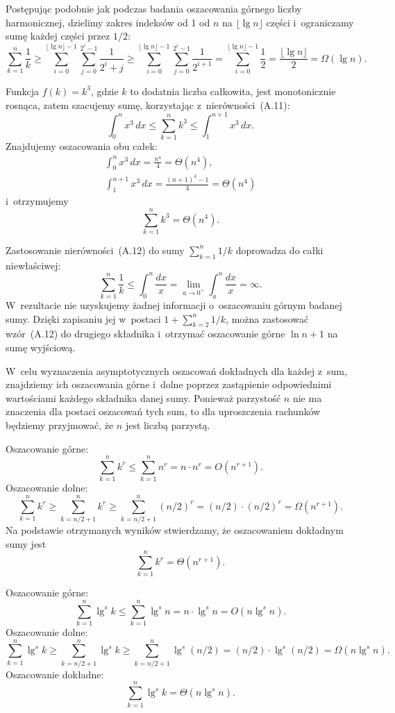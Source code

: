 \exercise %
Postępując podobnie jak podczas badania oszacowania górnego  liczby harmonicznej, dzielimy zakres indeksów od 1 od $n$ na $\lfloor\lg n\rfloor$ części i~ograniczamy sumę każdej części przez $1/2$:
\[
    \sum_{k=1}^n\frac{1}{k} \ge \sum_{i=0}^{\lfloor\lg n\rfloor-1}\sum_{j=0}^{2^i-1}\frac{1}{2^i+j} \ge \sum_{i=0}^{\lfloor\lg n\rfloor-1}\sum_{j=0}^{2^i-1}\frac{1}{2^{i+1}} = \sum_{i=0}^{\lfloor\lg n\rfloor-1}\frac{1}{2} = \frac{\lfloor\lg n\rfloor}{2} = \Omega(\lg n).
\]

\exercise %
Funkcja $f(k)=k^3$, gdzie $k$ to dodatnia liczba całkowita, jest monotonicznie rosnąca, zatem szacujemy sumę, korzystając z~nierówności~(A.11):
\[
	\int_0^nx^3\,dx \le \sum_{k=1}^nk^3 \le \int_1^{n+1}x^3\,dx.
\]
Znajdujemy oszacowania obu całek:
\begin{gather*}
	\int_0^nx^3\,dx = \frac{n^4}{4} = \Theta(n^4), \\[2mm]
	\int_1^{n+1}x^3\,dx = \frac{(n+1)^4-1}{4} = \Theta(n^4)
\end{gather*}
i~otrzymujemy
\[
	\sum_{k=1}^nk^3 = \Theta(n^4).
\]

\exercise %
Zastosowanie nierówności~(A.12) do sumy $\sum_{k=1}^n1/k$ doprowadza do całki niewłaściwej:
\[
	\sum_{k=1}^n\frac{1}{k} \le \int_0^n\frac{dx}{x} = \lim_{a\to0^+}\int_a^n\frac{dx}{x} = \infty.
\]
W~rezultacie nie uzyskujemy żadnej informacji o~oszacowaniu górnym badanej sumy. Dzięki zapisaniu jej w~postaci $1+\sum_{k=2}^n1/k$, można zastosować wzór~(A.12) do drugiego składnika i~otrzymać oszacowanie górne $\ln n+1$ na sumę wyjściową.

\problems

W~celu wyznaczenia asymptotycznych oszacowań dokładnych dla każdej z~sum, znajdziemy ich oszacowania górne i~dolne poprzez zastąpienie odpowiednimi wartościami każdego składnika danej sumy. Ponieważ parzystość $n$ nie ma znaczenia dla postaci oszacowań tych sum, to dla uproszczenia rachunków będziemy przyjmować, że $n$ jest liczbą parzystą.

\subproblem %
Oszacowanie górne:
\[
    \sum_{k=1}^nk^r \le \sum_{k=1}^nn^r = n\cdot n^r = O(n^{r+1}).
\]
Oszacowanie dolne:
\[
    \sum_{k=1}^nk^r \ge \sum_{k=n/2+1}^nk^r \ge \sum_{k=n/2+1}^n(n/2)^r = (n/2)\cdot(n/2)^r = \Omega(n^{r+1}).
\]
Na podstawie otrzymanych wyników stwierdzamy, że oszacowaniem dokładnym sumy jest
\[
    \sum_{k=1}^nk^r = \Theta(n^{r+1}).
\]

\subproblem %
Oszacowanie górne:
\[
    \sum_{k=1}^n\lg^sk \le \sum_{k=1}^n\lg^sn = n\cdot\lg^sn = O(n\lg^sn).
\]
Oszacowanie dolne:
\[
    \sum_{k=1}^n\lg^sk \ge \sum_{k=n/2+1}^n\lg^sk \ge \sum_{k=n/2+1}^n\lg^s(n/2) = (n/2)\cdot\lg^s(n/2) = \Omega(n\lg^sn).
\]
Oszacowanie dokładne:
\[
    \sum_{k=1}^n\lg^sk = \Theta(n\lg^sn).
\]

